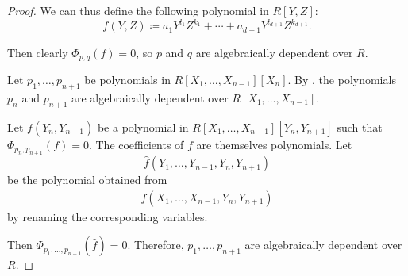 \begin{proof}
  We can thus define the following polynomial in \( R[Y, Z] \):
  \begin{equation*}
    f(Y, Z) \coloneqq a_1 Y^{l_1} Z^{k_1} + \cdots + a_{d+1} Y^{l_{d+1}} Z^{k_{d+1}}.
  \end{equation*}

  Then clearly \( \Phi_{p,q}(f) = 0 \), so \( p \) and \( q \) are algebraically dependent over \( R \).

   Let \( p_1, \ldots, p_{n+1} \) be polynomials in \( R[X_1, \ldots, X_{n-1}][X_n] \). By , the polynomials \( p_n \) and \( p_{n+1} \) are algebraically dependent over \( R[X_1, \ldots, X_{n-1}] \).

  Let \( f(Y_n, Y_{n+1}) \) be a polynomial in \( R[X_1, \ldots, X_{n-1}][Y_n, Y_{n+1}] \) such that \( \Phi_{p_n,p_{n+1}}(f) = 0 \). The coefficients of \( f \) are themselves polynomials. Let
  \begin{equation*}
    \widehat{f}(Y_1, \ldots, Y_{n-1}, Y_n, Y_{n+1})
  \end{equation*}
  be the polynomial obtained from
  \begin{align*}
    f(X_1, \ldots, X_{n-1}, Y_n, Y_{n+1})
  \end{align*}
  by renaming the corresponding variables.

  Then \( \Phi_{p_1,\ldots,p_{n+1}}(\widehat{f}) = 0 \). Therefore, \( p_1, \ldots, p_{n+1} \) are algebraically dependent over \( R \).
\end{proof}

